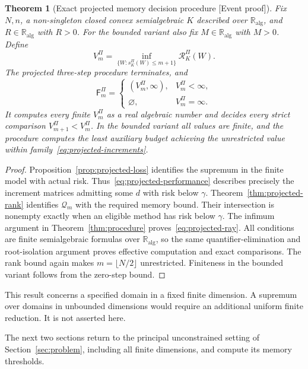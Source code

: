 \documentclass[11pt]{article}
\newcommand{\supportlabel}[1]{\textcolor{blue!60!black}{\small\textsf{[#1]}}}
\newcommand{\eventproof}{\supportlabel{Event proof}}
\numberwithin{equation}{section}
\newtheorem{theorem}{Theorem}[section]
\theoremstyle{definition}
\newcommand{\K}{\mathbb R_{\mathrm{alg}}}
\newcommand{\Q}{\mathcal Q}
\newcommand{\risk}{\mathcal R}
\begin{document}
\begin{samepage}
\begin{theorem}[Exact projected memory decision procedure \eventproof]\label{thm:projected-procedure}
Fix $N,n$, a non-singleton closed convex semialgebraic $K$ described over $\K$, and $R\in\K$ with $R>0$. For the bounded variant also fix $M\in\K$ with $M>0$. Define
\[
 V_m^\Pi
 =\inf_{\{W:s_K^\Pi(W)\le m+1\}}\risk_K^\Pi(W).
\]
The projected three-step procedure terminates, and
\begin{equation}
 \mathsf F_m^\Pi=
 \begin{cases}
 (V_m^\Pi,\infty),&V_m^\Pi<\infty,\\
 \varnothing,&V_m^\Pi=\infty.
 \end{cases}
 \label{eq:projected-ray}
\end{equation}
It computes every finite $V_m^\Pi$ as a real algebraic number and decides every strict comparison $V_{m+1}^\Pi<V_m^\Pi$. In the bounded variant all values are finite, and the procedure computes the least auxiliary budget achieving the unrestricted value within family~\eqref{eq:projected-increments}.
\end{theorem}
\end{samepage}
\begin{proof}
Proposition~\ref{prop:projected-loss} identifies the supremum in the finite model with actual risk. Thus~\eqref{eq:projected-performance} describes precisely the increment matrices admitting some $d$ with risk below $\gamma$. Theorem~\ref{thm:projected-rank} identifies $\Q_m$ with the required memory bound. Their intersection is nonempty exactly when an eligible method has risk below $\gamma$. The infimum argument in Theorem~\ref{thm:procedure} proves~\eqref{eq:projected-ray}. All conditions are finite semialgebraic formulas over $\K$, so the same quantifier-elimination and root-isolation argument proves effective computation and exact comparisons. The rank bound again makes $m=\lfloor N/2\rfloor$ unrestricted. Finiteness in the bounded variant follows from the zero-step bound.
\end{proof}

This result concerns a specified domain in a fixed finite dimension. A supremum over domains in unbounded dimensions would require an additional uniform finite reduction. It is not asserted here.

\FloatBarrier

The next two sections return to the principal unconstrained setting of Section~\ref{sec:problem}, including all finite dimensions, and compute its memory thresholds.
\end{document}
